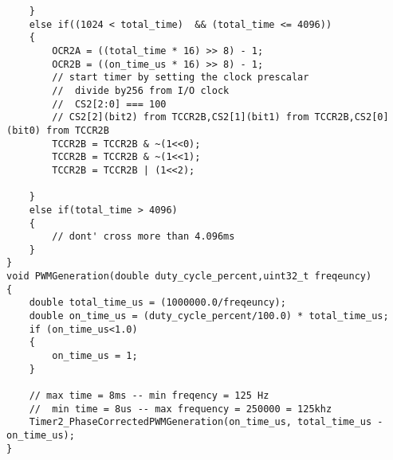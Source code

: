 \begin{verbatim}
	}
	else if((1024 < total_time)  && (total_time <= 4096))
	{
		OCR2A = ((total_time * 16) >> 8) - 1;
		OCR2B = ((on_time_us * 16) >> 8) - 1;
		// start timer by setting the clock prescalar
		//  divide by256 from I/O clock
		//  CS2[2:0] === 100
		// CS2[2](bit2) from TCCR2B,CS2[1](bit1) from TCCR2B,CS2[0](bit0) from TCCR2B
		TCCR2B = TCCR2B & ~(1<<0);
		TCCR2B = TCCR2B & ~(1<<1);
		TCCR2B = TCCR2B | (1<<2);
		
	}
	else if(total_time > 4096)
	{
		// dont' cross more than 4.096ms
	}
}
void PWMGeneration(double duty_cycle_percent,uint32_t freqeuncy)
{
	double total_time_us = (1000000.0/freqeuncy);	
	double on_time_us = (duty_cycle_percent/100.0) * total_time_us;
	if (on_time_us<1.0)
	{
		on_time_us = 1;
	}
	
	// max time = 8ms -- min freqency = 125 Hz
	//  min time = 8us -- max frequency = 250000 = 125khz
	Timer2_PhaseCorrectedPWMGeneration(on_time_us, total_time_us - on_time_us);
}
\end{verbatim}



% 